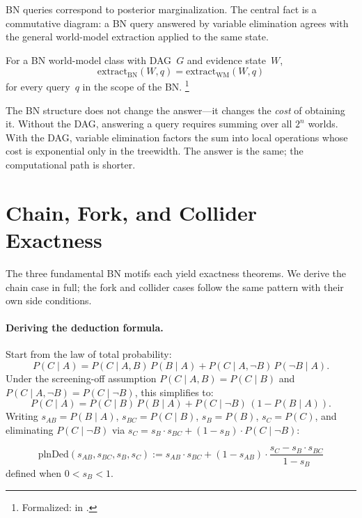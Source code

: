 \documentclass[11pt,openany]{report}
\begin{document}
BN queries correspond to posterior marginalization.  The central
fact is a commutative diagram: a BN query answered by variable
elimination agrees with the general world-model extraction applied
to the same state.

\begin{theorem}
For a BN world-model class with DAG~$G$ and evidence state~$W$,
\[
  \mathrm{extract}_{\mathrm{BN}}(W, q) = \mathrm{extract}_{\mathrm{WM}}(W, q)
\]
for every query~$q$ in the scope of the BN.%
\footnote{Formalized:
 in
.}
\end{theorem}

\noindent
The BN structure does not change the answer---it changes the
\emph{cost} of obtaining it.  Without the DAG, answering a query
requires summing over all $2^n$ worlds.  With the DAG, variable
elimination factors the sum into local operations whose cost is
exponential only in the treewidth.  The answer is the same;
the computational path is shorter.


\section{Chain, Fork, and Collider Exactness}

The three fundamental BN motifs each yield exactness theorems.
We derive the chain case in full; the fork and collider cases
follow the same pattern with their own side conditions.

\paragraph{Deriving the deduction formula.}
Start from the law of total probability:
\[
  P(C \mid A) = P(C \mid A, B)\,P(B \mid A)
              + P(C \mid A, \neg B)\,P(\neg B \mid A).
\]
Under the screening-off assumption $P(C \mid A, B) = P(C \mid B)$
and $P(C \mid A, \neg B) = P(C \mid \neg B)$, this simplifies to:
\[
  P(C \mid A) = P(C \mid B)\,P(B \mid A)
              + P(C \mid \neg B)\,(1 - P(B \mid A)).
\]
Writing $s_{AB} = P(B \mid A)$, $s_{BC} = P(C \mid B)$,
$s_B = P(B)$, $s_C = P(C)$, and eliminating $P(C \mid \neg B)$
via $s_C = s_B \cdot s_{BC} + (1 - s_B) \cdot P(C \mid \neg B)$:

\begin{definition}
\label{def:deduction-strength}
\[
  \mathrm{plnDed}(s_{AB}, s_{BC}, s_B, s_C) :=
  s_{AB} \cdot s_{BC}
  + (1 - s_{AB}) \cdot \frac{s_C - s_B \cdot s_{BC}}{1 - s_B}
\]
defined when $0 < s_B < 1$.
\end{definition}
\end{document}
